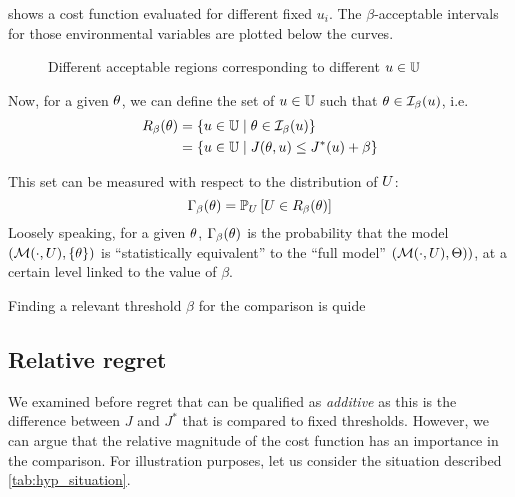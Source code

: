 \documentclass[../../Main_ManuscritThese.tex]{subfiles}
\newcommand\imgpath{/home/victor/acadwriting/Manuscrit/Text/Chapter3/img/}
\begin{document}
 shows a cost function evaluated for different fixed $u_i$. The $\beta$-acceptable intervals for those environmental variables are plotted below the curves.
\begin{figure}[ht]
  \centering
  
  \caption{\label{fig:lik_interval_threshold} Different acceptable regions corresponding to different $u \in \mathbb{U}$}
\end{figure}

  Now, for a given $\theta$, we can define the set of $u\in \mathbb{U}$ such that $\theta \in  \mathcal{I}_{\beta}(u)$, i.e.\
  \begin{align}
    R_{\beta}(\theta) &= \left\{u\in \mathbb{U} \mid \theta \in \mathcal{I}_{\beta}(u) \right\} \\
           &= \left\{u\in \mathbb{U} \mid J(\theta, u)  \leq J^*(u) + \beta \right\}
  \end{align}

  This set can be measured with respect to the distribution of $U$:
  \begin{equation}
    \Gamma_\beta(\theta) = \mathbb{P}_U\left[U \in R_{\beta}(\theta)\right]
  \end{equation}
  Loosely speaking, for a given $\theta$, $\Gamma_{\beta}(\theta)$ is the probability that the model $(\mathcal{M}(\cdot, U), \{\theta\})$ is ``statistically equivalent'' to the ``full model'' $\left(\mathcal{M}(\cdot, U), \Theta)\right)$, at a certain level linked to the value of $\beta$.

  Finding a relevant threshold $\beta$ for the comparison is quide
\subsection{Relative regret}
We examined before regret that can be qualified as \emph{additive} as this is the difference between $J$ and $J^*$ that is compared to fixed thresholds.
However, we can argue that the relative magnitude of the cost function has an importance in the comparison. For illustration purposes, let us consider the situation described \cref{tab:hyp_situation}.
\end{document}
